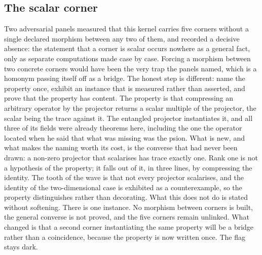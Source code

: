 \documentclass[11pt]{article}
\theoremstyle{definition}\newtheorem{deriv}{Derivation}
\begin{document}
\subsection*{The scalar corner}Two adversarial panels measured that this kernel carries five corners without a single declared morphism between any two of them, and recorded a decisive absence: the statement that a corner is scalar occurs nowhere as a general fact, only as separate computations made case by case. Forcing a morphism between two concrete corners would have been the very trap the panels named, which is a homonym passing itself off as a bridge. The honest step is different: name the property once, exhibit an instance that is measured rather than asserted, and prove that the property has content. The property is that compressing an arbitrary operator by the projector returns a scalar multiple of the projector, the scalar being the trace against it. The entangled projector instantiates it, and all three of its fields were already theorems here, including the one the operator located when he said that what was missing was the psion. What is new, and what makes the naming worth its cost, is the converse that had never been drawn: a non-zero projector that scalarises has trace exactly one. Rank one is not a hypothesis of the property; it falls out of it, in three lines, by compressing the identity. The tooth of the wave is that not every projector scalarises, and the identity of the two-dimensional case is exhibited as a counterexample, so the property distinguishes rather than decorating. What this does not do is stated without softening. There is one instance. No morphism between corners is built, the general converse is not proved, and the five corners remain unlinked. What changed is that a second corner instantiating the same property will be a bridge rather than a coincidence, because the property is now written once. The flag stays dark.
\end{document}
